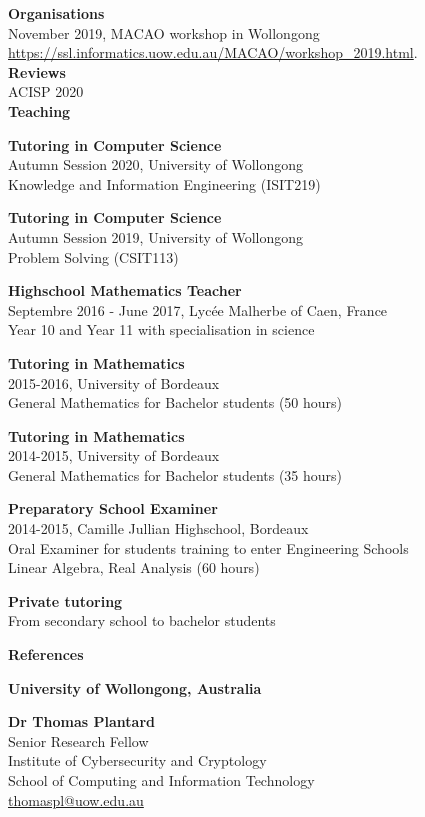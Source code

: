 \documentclass[a4paper,12pt,final]{memoir}
\newcommand{\Sep}{\vspace{1.5em}}
\newcommand{\SmallSep}{\vspace{0.5em}}
\newcommand{\CVSection}[1]
{\Large\textbf{#1}\par
  \SmallSep\normalsize\normalfont}
\newcommand{\CVItem}[1]
{\textbf{\color{RoyalBlue} #1}}
\begin{document}
\CVItem{Organisations} \\
November 2019, MACAO workshop in Wollongong \\
\url{https://ssl.informatics.uow.edu.au/MACAO/workshop_2019.html}. \\

\CVItem{Reviews} \\
ACISP 2020 \\

\CVSection{Teaching}

\CVItem{Tutoring in Computer Science}\\
Autumn Session 2020, University of Wollongong\\
Knowledge and Information Engineering (ISIT219)
\SmallSep

\CVItem{Tutoring in Computer Science}\\
Autumn Session 2019, University of Wollongong\\
Problem Solving (CSIT113)
\SmallSep

\CVItem{Highschool Mathematics Teacher}\\
Septembre 2016 - June 2017, Lycée Malherbe of Caen, France\\
Year 10 and Year 11 with specialisation in science
\SmallSep

\CVItem{Tutoring in Mathematics}\\
2015-2016, University of Bordeaux\\
General Mathematics for Bachelor students (50 hours)
\SmallSep

\CVItem{Tutoring in Mathematics}\\
2014-2015, University of Bordeaux\\
General Mathematics for Bachelor students (35 hours)
\SmallSep

\CVItem{Preparatory School Examiner}\\
2014-2015, Camille Jullian Highschool, Bordeaux\\
Oral Examiner for students training to enter Engineering Schools\\
Linear Algebra, Real Analysis (60 hours)
\SmallSep

\CVItem{Private tutoring}\\
From secondary school to bachelor students
\SmallSep
\Sep

\clearpage
\framebreak
\framebreak

\CVSection{References}
\CVItem{University of Wollongong, Australia} 

\textbf{Dr Thomas Plantard} \\
Senior Research Fellow\\
Institute of Cybersecurity and Cryptology \\
School of Computing and Information Technology  \\
\url{thomaspl@uow.edu.au} \\
\end{document}

